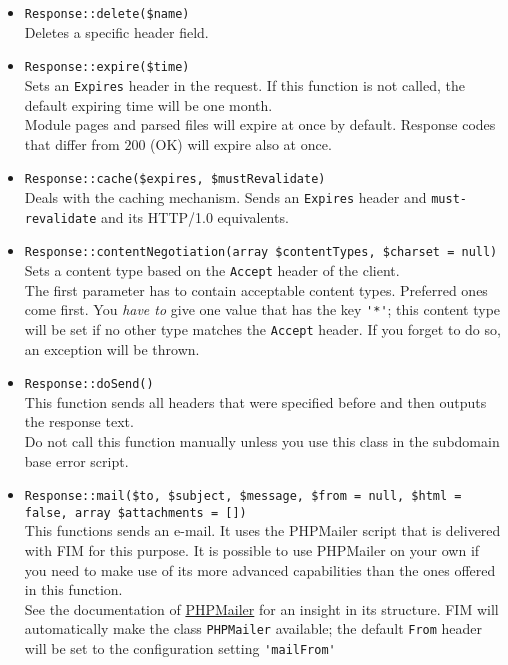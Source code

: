 \documentclass{scrartcl}
\begin{document}
\begin{itemize}
         \item \lstinline!Response::delete($name)! \\
            Deletes a specific header field.
         \item \lstinline!Response::expire($time)! \\
            Sets an \texttt{Expires} header in the request. If this function is not called, the default expiring time will be one month. \\
            Module pages and parsed files will expire at once by default. Response codes that differ from $200$ (OK) will expire also at once.
         \item \lstinline!Response::cache($expires, $mustRevalidate)! \\
            Deals with the caching mechanism. Sends an \texttt{Expires} header and \texttt{must-revalidate} and its HTTP/1.0 equivalents.
         \item \lstinline!Response::contentNegotiation(array $contentTypes, $charset = null)! \\
            Sets a content type based on the \texttt{Accept} header of the client. \\
            The first parameter has to contain acceptable content types. Preferred  ones come first. You \emph{have to} give one value that has the key \lstinline!'*'!; this content type will be set if no other type matches the \texttt{Accept} header. If you forget to do so, an exception will be thrown.
         \item \lstinline!Response::doSend()! \\
            This function sends all headers that were specified before and then outputs the response text. \\
            Do not call this function manually unless you use this class in the subdomain base error script.
         \item \lstinline!Response::mail($to, $subject, $message, $from = null, $html = false, array $attachments = [])! \\
            This functions sends an e-mail. It uses the PHPMailer script that is delivered with FIM for this purpose. It is possible to use PHPMailer on your own if you need to make use of its more advanced capabilities than the ones offered in this function. \\
            See the documentation of \href{https://github.com/PHPMailer/PHPMailer}{\color{blue}PHPMailer} for an insight in its structure. FIM will automatically make the class \lstinline!PHPMailer! available; the default \texttt{From} header will be set to the configuration setting \lstinline!'mailFrom'!
      \end{itemize}
\end{document}
